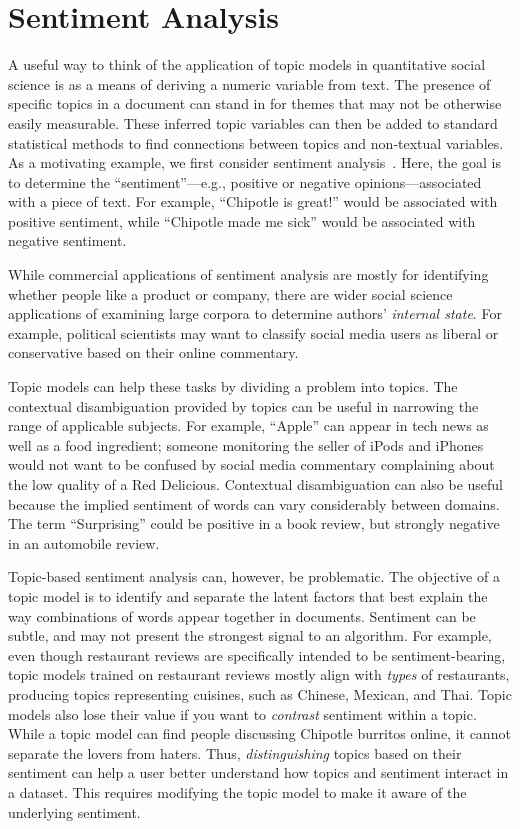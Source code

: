 \section{Sentiment Analysis}

A useful way to think of the application of topic models in quantitative social science is as a means of deriving a numeric variable from text.
The presence of specific topics in a document can stand in for themes that may not be otherwise easily measurable.
These inferred topic variables can then be added to standard statistical methods to find connections between topics and non-textual variables.
As a motivating example, we first consider sentiment analysis~\citep{pang-08}.  Here, the goal is to determine the
``sentiment''---e.g., positive or negative opinions---associated with
a piece of text.  For example, ``Chipotle is great!'' would be
associated with positive sentiment, while ``Chipotle made me sick''
would be associated with negative sentiment.

While commercial applications of sentiment analysis are mostly for
identifying whether people like a product or company, there are wider
social science applications of examining large corpora to determine
authors' \emph{internal state}.  For example, political scientists may
want to classify social media users as liberal or conservative based on their online
commentary.

Topic models can help these tasks by dividing a problem into topics.
The contextual disambiguation provided by topics can be useful in 
narrowing the range of applicable subjects.
For example, ``Apple'' can appear in tech news as well as a food
ingredient; someone monitoring the seller of iPods and iPhones would
not want to be confused by social media commentary complaining about 
the low quality of a Red Delicious. 
Contextual disambiguation can also be useful because the implied sentiment of words 
can vary considerably between domains.
The term ``Surprising'' could be positive in a book review, but 
strongly negative in an automobile review.

Topic-based sentiment analysis can, however, be problematic.
The objective of a topic model is to identify and separate the latent factors that best explain the way combinations of words appear together in documents.
Sentiment can be subtle, and may not present the strongest signal to an algorithm.
For example, even though restaurant reviews are specifically intended to be sentiment-bearing, topic models trained on restaurant reviews mostly align with {\em types} of restaurants, producing topics representing cuisines, such as Chinese, Mexican, and Thai.
Topic models also lose their value if you want to \emph{contrast}
sentiment within a topic.  While a topic model can find people
discussing Chipotle burritos online, it cannot separate the lovers from
haters.  Thus, \emph{distinguishing} topics based on their sentiment
can help a user better understand how topics and sentiment interact in
a dataset.  This requires modifying the topic model to make it aware
of the underlying sentiment.

